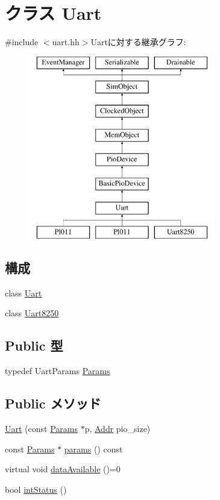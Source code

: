 \hypertarget{classUart}{
\section{クラス Uart}
\label{classUart}
}


{\ttfamily \#include $<$uart.hh$>$}Uartに対する継承グラフ:\begin{figure}[H]
\begin{center}
\leavevmode
\includegraphics[height=8cm]{classUart}
\end{center}
\end{figure}
\subsection*{構成}
\begin{DoxyCompactItemize}
\item 
class \hyperlink{classUart_1_1Uart}{Uart}
\item 
class \hyperlink{classUart_1_1Uart8250}{Uart8250}
\end{DoxyCompactItemize}
\subsection*{Public 型}
\begin{DoxyCompactItemize}
\item 
typedef UartParams \hyperlink{classUart_a20a580db9778bd0604704c3c6baabfa6}{Params}
\end{DoxyCompactItemize}
\subsection*{Public メソッド}
\begin{DoxyCompactItemize}
\item 
\hyperlink{classUart_a8976dbcdc99368c9aa2e9aed71bd49da}{Uart} (const \hyperlink{classUart_a20a580db9778bd0604704c3c6baabfa6}{Params} $\ast$p, \hyperlink{base_2types_8hh_af1bb03d6a4ee096394a6749f0a169232}{Addr} pio\_\-size)
\item 
const \hyperlink{classUart_a20a580db9778bd0604704c3c6baabfa6}{Params} $\ast$ \hyperlink{classUart_acd3c3feb78ae7a8f88fe0f110a718dff}{params} () const 
\item 
virtual void \hyperlink{classUart_a8e0026e4db90ce7efbddf2835f411b0b}{dataAvailable} ()=0
\item 
bool \hyperlink{classUart_a73c7d9c634e4c31cda71a6dd2fa67381}{intStatus} ()
\end{DoxyCompactItemize}
